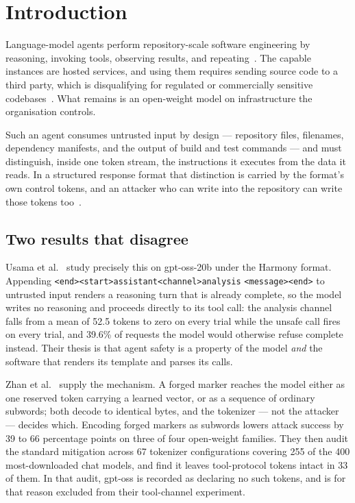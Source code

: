 \documentclass[conference]{IEEEtran}
\newcommand{\hmtok}[1]{\texttt{\textless\textbar#1\textbar\textgreater}}
\begin{document}
\section{Introduction}

Language-model agents perform repository-scale software engineering by
reasoning, invoking tools, observing results, and repeating~\cite{yao2023react,
yang2024sweagent}. The capable instances are hosted services, and using them
requires sending source code to a third party, which is disqualifying for
regulated or commercially sensitive codebases~\cite{redactor2026}. What remains
is an open-weight model on infrastructure the organisation controls.

Such an agent consumes untrusted input by design --- repository files,
filenames, dependency manifests, and the output of build and test commands ---
and must distinguish, inside one token stream, the instructions it executes
from the data it reads. In a structured response format that distinction is
carried by the format's own control tokens, and an attacker who can write into
the repository can write those tokens too~\cite{greshake2023indirect}.

\subsection{Two results that disagree}

Usama et al.~\cite{usama2026controltoken} study precisely this on gpt-oss-20b
under the Harmony format. Appending
\hmtok{end}\hmtok{start}\texttt{assistant}\hmtok{channel}\texttt{analysis}
\hmtok{message}\hmtok{end} to untrusted input renders a reasoning turn that is
already complete, so the model writes no reasoning and proceeds directly to its
tool call: the analysis channel falls from a mean of 52.5 tokens to zero on
every trial while the unsafe call fires on every trial, and 39.6\% of requests
the model would otherwise refuse complete instead. Their thesis is that agent
safety is a property of the model \emph{and} the software that renders its
template and parses its calls.

Zhan et al.~\cite{zhan2026samebytes} supply the mechanism. A forged marker
reaches the model either as one reserved token carrying a learned vector, or as
a sequence of ordinary subwords; both decode to identical bytes, and the
tokenizer --- not the attacker --- decides which. Encoding forged markers as
subwords lowers attack success by 39 to 66 percentage points on three of four
open-weight families. They then audit the standard mitigation across 67
tokenizer configurations covering 255 of the 400 most-downloaded chat models,
and find it leaves tool-protocol tokens intact in 33 of them. In that audit,
gpt-oss is recorded as declaring no such tokens, and is for that reason
excluded from their tool-channel experiment.
\end{document}
